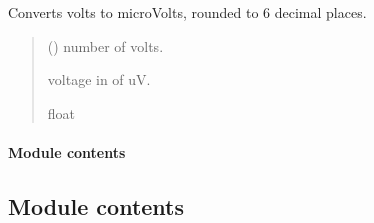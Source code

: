 \documentclass[letterpaper,10pt,english]{sphinxmanual}
\begin{document}
\begin{fulllineitems}
\begin{fulllineitems}
\end{fulllineitems}


\begin{fulllineitems}
\label{\detokenize{Setup.SetupOneDevice:Setup.SetupOneDevice.Setup_PodInterface.SetupInterface._uV}}
\pysigstartsignatures
{}
\pysigstopsignatures
\sphinxAtStartPar
Converts volts to microVolts, rounded to 6 decimal places.
\begin{quote}\begin{description}
\sphinxAtStartPar
{} (\sphinxstyleliteralemphasis{\sphinxupquote{ | }}) \textendash{} number of volts.

\sphinxAtStartPar
voltage in of uV.

\sphinxAtStartPar
float

\end{description}\end{quote}

\end{fulllineitems}


\end{fulllineitems}



\paragraph{Module contents}
\label{\detokenize{Setup.SetupOneDevice:module-Setup.SetupOneDevice}}\label{\detokenize{Setup.SetupOneDevice:module-contents}}

\subsection{Module contents}
\label{\detokenize{Setup:module-Setup}}\label{\detokenize{Setup:module-contents}}
\end{document}
